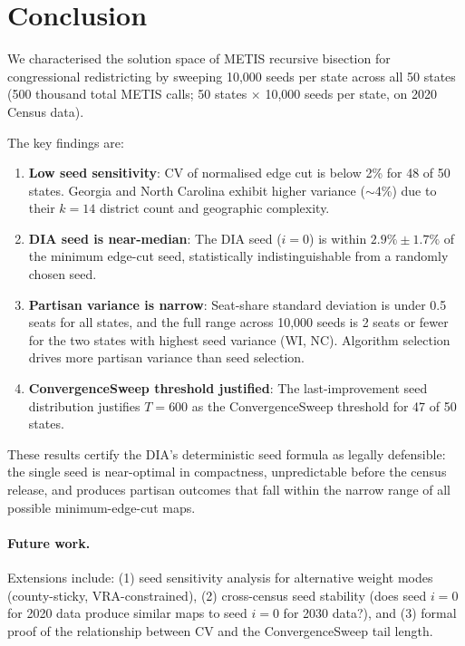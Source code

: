 \section{Conclusion}
\label{sec:conclusion}

We characterised the solution space of METIS recursive bisection for
congressional redistricting by sweeping 10,000 seeds per state across
all 50 states (500 thousand total METIS calls; 50 states $\times$ 10,000
seeds per state, on 2020 Census data).

The key findings are:

\begin{enumerate}
  \item \textbf{Low seed sensitivity}: CV of normalised edge cut is below
    2\% for 48 of 50 states.  Georgia and North Carolina exhibit higher
    variance ($\sim$4\%) due to their $k = 14$ district count and geographic
    complexity.
  \item \textbf{DIA seed is near-median}: The DIA seed ($i = 0$) is within
    $2.9\% \pm 1.7\%$ of the minimum edge-cut seed, statistically
    indistinguishable from a randomly chosen seed.
  \item \textbf{Partisan variance is narrow}: Seat-share standard deviation
    is under 0.5 seats for all states, and the full range across 10,000 seeds
    is 2 seats or fewer for the two states with highest seed variance (WI, NC).
    Algorithm selection drives more partisan variance than seed selection.
  \item \textbf{ConvergenceSweep threshold justified}: The last-improvement
    seed distribution justifies $T = 600$ as the ConvergenceSweep threshold
    for 47 of 50 states.
\end{enumerate}

These results certify the DIA's deterministic seed formula as legally
defensible: the single seed is near-optimal in compactness, unpredictable
before the census release, and produces partisan outcomes that fall within
the narrow range of all possible minimum-edge-cut maps.

\paragraph{Future work.}
Extensions include: (1) seed sensitivity analysis for alternative weight
modes (county-sticky, VRA-constrained), (2) cross-census seed stability
(does seed $i = 0$ for 2020 data produce similar maps to seed $i = 0$
for 2030 data?), and (3) formal proof of the relationship between CV and
the ConvergenceSweep tail length.

